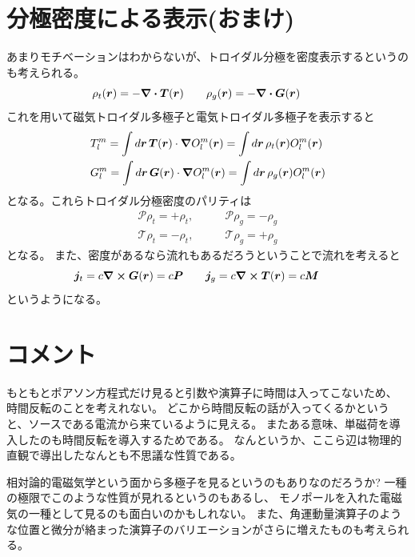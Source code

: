 \documentclass[../../master.tex]{subfiles}
\begin{document}
\section{分極密度による表示(おまけ)}
あまりモチベーションはわからないが、トロイダル分極を密度表示するというのも考えられる。
\begin{equation}
    \rho_t(\vb*{r}) = -\div \vb*{T}(\vb*{r}) \qquad
    \rho_g(\vb*{r}) = -\div \vb*{G}(\vb*{r}) \qquad
\end{equation}
これを用いて磁気トロイダル多極子と電気トロイダル多極子を表示すると
\begin{align}
    &T_l^m
    = \int d\vb*{r}\, \vb*{T}(\vb*{r})\cdot \grad O_l^m(\vb*{r})
    = \int d\vb*{r}\, \rho_t(\vb*{r}) O_l^m(\vb*{r})\\
    &G_l^m
    = \int d\vb*{r}\, \vb*{G}(\vb*{r})\cdot \grad O_l^m(\vb*{r})
    = \int d\vb*{r}\, \rho_g(\vb*{r}) O_l^m(\vb*{r})
\end{align}
となる。これらトロイダル分極密度のパリティは
\begin{align}
    \mathcal{P} \rho_t = + \rho_t, \qquad&
    \mathcal{P} \rho_g = - \rho_g \\
    \mathcal{T} \rho_t = - \rho_t, \qquad&
    \mathcal{T} \rho_g = + \rho_g
\end{align}
となる。
また、密度があるなら流れもあるだろうということで流れを考えると
\begin{equation}
    \vb*{j}_t = c \curl \vb*{G} (\vb*{r}) = c \vb*{P} \qquad
    \vb*{j}_g = c \curl \vb*{T} (\vb*{r}) = c \vb*{M} \qquad
\end{equation}
というようになる。

\section{コメント}
もともとポアソン方程式だけ見ると引数や演算子に時間は入ってこないため、
時間反転のことを考えれない。
どこから時間反転の話が入ってくるかというと、ソースである電流から来ているように見える。
またある意味、単磁荷を導入したのも時間反転を導入するためである。
なんというか、ここら辺は物理的直観で導出したなんとも不思議な性質である。

相対論的電磁気学という面から多極子を見るというのもありなのだろうか?
一種の極限でこのような性質が見れるというのもあるし、
モノポールを入れた電磁気の一種として見るのも面白いのかもしれない。
また、角運動量演算子のような位置と微分が絡まった演算子のバリエーションがさらに増えたものも考えられる。
\end{document}
